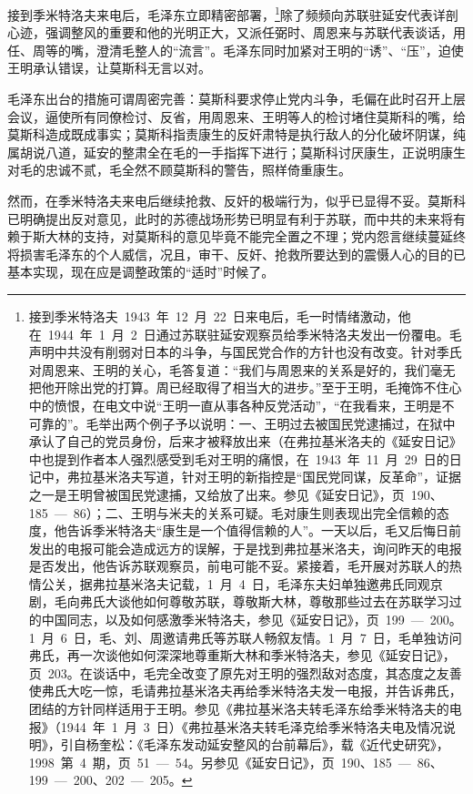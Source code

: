 接到季米特洛夫来电后，毛泽东立即精密部署，\footnote{接到季米特洛夫~1943~年~12~月~22~日来电后，毛一时情绪激动，他在~1944~年~1~月~2~日通过苏联驻延安观察员给季米特洛夫发出一份覆电。毛声明中共没有削弱对日本的斗争，与国民党合作的方针也没有改变。针对季氏对周恩来、王明的关心，毛答复道：“我们与周恩来的关系是好的，我们毫无把他开除出党的打算。周已经取得了相当大的进步。”至于王明，毛掩饰不住心中的愤恨，在电文中说“王明一直从事各种反党活动”，“在我看来，王明是不可靠的”。毛举出两个例子予以说明：一、王明过去被国民党逮捕过，在狱中承认了自己的党员身份，后来才被释放出来（在弗拉基米洛夫的《延安日记》中也提到作者本人强烈感受到毛对王明的痛恨，在~1943~年~11~月~29~日的日记中，弗拉基米洛夫写道，针对王明的新指控是“国民党同谋，反革命”，证据之一是王明曾被国民党逮捕，又给放了出来。参见《延安日记》，页~190、185~—~86）；二、王明与米夫的关系可疑。毛对康生则表现出完全信赖的态度，他告诉季米特洛夫“康生是一个值得信赖的人”。一天以后，毛又后悔日前发出的电报可能会造成远方的误解，于是找到弗拉基米洛夫，询问昨天的电报是否发出，他告诉苏联观察员，前电可能不妥。紧接着，毛开展对苏联人的热情公关，据弗拉基米洛夫记载，1~月~4~日，毛泽东夫妇单独邀弗氏同观京剧，毛向弗氏大谈他如何尊敬苏联，尊敬斯大林，尊敬那些过去在苏联学习过的中国同志，以及如何感激季米特洛夫，参见《延安日记》，页~199~—~200。1~月~6~日，毛、刘、周邀请弗氏等苏联人畅叙友情。1~月~7~日，毛单独访问弗氏，再一次谈他如何深深地尊重斯大林和季米特洛夫，参见《延安日记》，页~203。在谈话中，毛完全改变了原先对王明的强烈敌对态度，其态度之友善使弗氏大吃一惊，毛请弗拉基米洛夫再给季米特洛夫发一电报，并告诉弗氏，团结的方针同样适用于王明。参见《弗拉基米洛夫转毛泽东给季米特洛夫的电报》（1944~年~1~月~3~日）《弗拉基米洛夫转毛泽克给季米特洛夫电及情况说明》，引自杨奎松：《毛泽东发动延安整风的台前幕后》，载《近代史研究》，1998~第~4~期，页~51~—~54。另参见《延安日记》，页~190、185~—~86、199~—~200、202~—~205。}除了频频向苏联驻延安代表详剖心迹，强调整风的重要和他的光明正大，又派任弼时、周恩来与苏联代表谈话，用任、周等的嘴，澄清毛整人的“流言”。毛泽东同时加紧对王明的“诱”、“压”，迫使王明承认错误，让莫斯科无言以对。

毛泽东出台的措施可谓周密完善：莫斯科要求停止党内斗争，毛偏在此时召开上层会议，逼使所有同僚检讨、反省，用周恩来、王明等人的检讨堵住莫斯科的嘴，给莫斯科造成既成事实；莫斯科指责康生的反奸肃特是执行敌人的分化破坏阴谋，纯属胡说八道，延安的整肃全在毛的一手指挥下进行；莫斯科讨厌康生，正说明康生对毛的忠诚不贰，毛全然不顾莫斯科的警告，照样倚重康生。

然而，在季米特洛夫来电后继续抢救、反奸的极端行为，似乎已显得不妥。莫斯科已明确提出反对意见，此时的苏德战场形势已明显有利于苏联，而中共的未来将有赖于斯大林的支持，对莫斯科的意见毕竟不能完全置之不理；党内怨言继续蔓延终将损害毛泽东的个人威信，况且，审干、反奸、抢救所要达到的震慑人心的目的已基本实现，现在应是调整政策的“适时”时候了。


